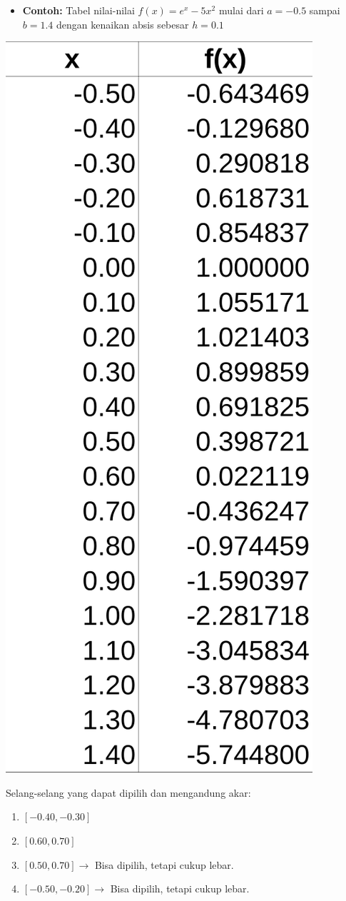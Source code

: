 \documentclass[pdflatex,compress]{beamer}
\begin{document}
\begin{frame}
	\begin{itemize}
		\item \textbf{Contoh:} Tabel nilai-nilai $ f(x) = e^x - 5x^2 $ mulai dari $ a = -0.5 $ sampai $ b = 1.4 $ dengan kenaikan absis sebesar $ h = 0.1 $		
	\end{itemize}
	\begin{multicols}{2}
	\begin{center}
		\includegraphics[width=0.5\linewidth]{img/img04.png}
	\end{center}
	\columnbreak
	Selang-selang yang dapat dipilih dan mengandung akar:
	\begin{enumerate}
		\item $ [-0.40, -0.30] $
		\item $ [0.60, 0.70] $
		\item $ [0.50, 0.70] \rightarrow $ Bisa dipilih, tetapi cukup lebar.
		\item $ [-0.50, -0.20] \rightarrow $ Bisa dipilih, tetapi cukup lebar.
	\end{enumerate}			
	\end{multicols}
\end{frame}
\end{document}
